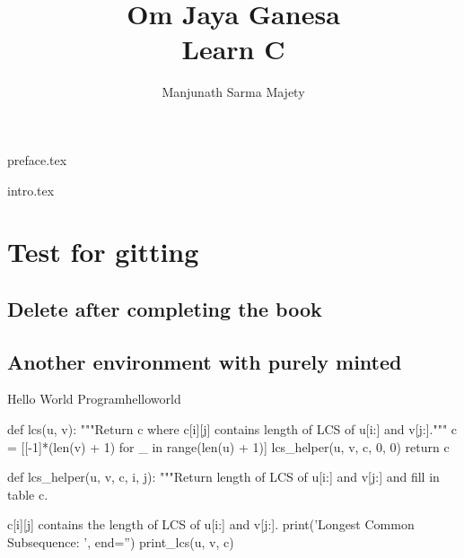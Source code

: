 \documentclass[10pt,a4paper]{memoir}
\begin{document}
	\title{{\bfseries Om Jaya Ganesa }\\ Learn C }
	\author{Manjunath Sarma Majety}
	\maketitle
	
	
	\newpage

	\begin{KeepFromToc}
		\tableofcontents
	\end{KeepFromToc}

	\clearpage
	\listofprograms
	\clearpage
	\listoffigures
	\clearpage

\frontmatter


	{preface.tex}


\mainmatter
	{intro.tex}






\chapter{Test for gitting }



\section{Delete after completing the book}


\section{Another environment with purely minted }




\begin{pycode}{Hello World Program}{helloworld}


def lcs(u, v):
"""Return c where c[i][j] contains length of LCS of u[i:] and v[j:]."""
c = [[-1]*(len(v) + 1) for _ in range(len(u) + 1)]
lcs_helper(u, v, c, 0, 0)
return c


def lcs_helper(u, v, c, i, j):
"""Return length of LCS of u[i:] and v[j:] and fill in table c.

c[i][j] contains the length of LCS of u[i:] and v[j:].
print('Longest Common Subsequence: ', end='')
print_lcs(u, v, c)

\end{pycode}
\end{document}
